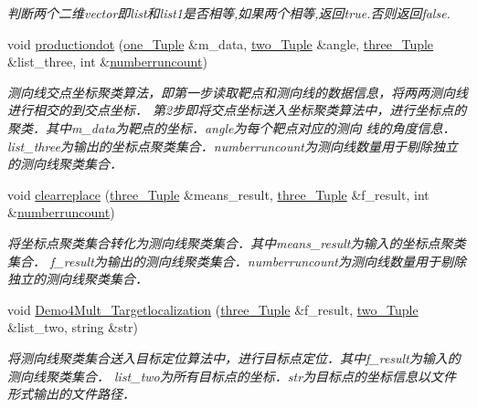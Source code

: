 \begin{DoxyCompactItemize}
\begin{DoxyCompactList}\small\item\em 判断两个二维vector即list和list1是否相等,如果两个相等,返回true.\+否则返回false. \end{DoxyCompactList}\item 
void \hyperlink{multiloc_8txt_a8dda36db37ab05174f7e3a8d175bfdb5}{productiondot} (\hyperlink{multiloc_8txt_a490e31016ad1c0d99b23e323d64e3aac}{one\+\_\+\+Tuple} \&m\+\_\+data, \hyperlink{multiloc_8txt_a2e41d128befae015727cbf20484696a9}{two\+\_\+\+Tuple} \&angle, \hyperlink{multiloc_8txt_aa614d5a3aa93583e717bf9a9c9b6627b}{three\+\_\+\+Tuple} \&list\+\_\+three, int \&\hyperlink{multiloc_8txt_a40bd71ae5bbd0f6944663390e9df5286}{numberruncount})
\begin{DoxyCompactList}\small\item\em 测向线交点坐标聚类算法，即第一步读取靶点和测向线的数据信息，将两两测向线进行相交的到交点坐标． 第2步即将交点坐标送入坐标聚类算法中，进行坐标点的聚类．其中m\+\_\+data为靶点的坐标．angle为每个靶点对应的测向 线的角度信息．list\+\_\+three为输出的坐标点聚类集合．numberruncount为测向线数量用于剔除独立的测向线聚类集合． \end{DoxyCompactList}\item 
void \hyperlink{multiloc_8txt_a14af2bbc38832ab108a4547430e4b3d9}{clearreplace} (\hyperlink{multiloc_8txt_aa614d5a3aa93583e717bf9a9c9b6627b}{three\+\_\+\+Tuple} \&means\+\_\+result, \hyperlink{multiloc_8txt_aa614d5a3aa93583e717bf9a9c9b6627b}{three\+\_\+\+Tuple} \&f\+\_\+result, int \&\hyperlink{multiloc_8txt_a40bd71ae5bbd0f6944663390e9df5286}{numberruncount})
\begin{DoxyCompactList}\small\item\em 将坐标点聚类集合转化为测向线聚类集合．其中means\+\_\+result为输入的坐标点聚类集合． f\+\_\+result为输出的测向线聚类集合．numberruncount为测向线数量用于剔除独立的测向线聚类集合． \end{DoxyCompactList}\item 
void \hyperlink{multiloc_8txt_af0c8b047d686d2de5b9f60b0ed805e41}{Demo4\+Mult\+\_\+\+Targetlocalization} (\hyperlink{multiloc_8txt_aa614d5a3aa93583e717bf9a9c9b6627b}{three\+\_\+\+Tuple} \&f\+\_\+result, \hyperlink{multiloc_8txt_a2e41d128befae015727cbf20484696a9}{two\+\_\+\+Tuple} \&list\+\_\+two, string \&str)
\begin{DoxyCompactList}\small\item\em 将测向线聚类集合送入目标定位算法中，进行目标点定位．其中f\+\_\+result为输入的测向线聚类集合． list\+\_\+two为所有目标点的坐标．str为目标点的坐标信息以文件形式输出的文件路径． \end{DoxyCompactList}\item 

\end{DoxyCompactItemize}
